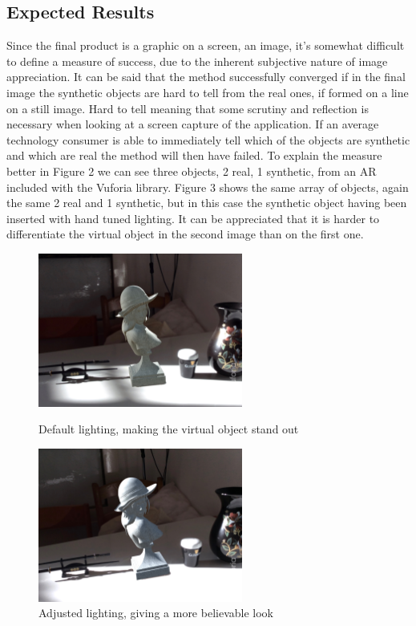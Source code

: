 \subsection{Expected Results}
Since the final product is a graphic on a screen, an image, it's somewhat difficult to define a measure of success, due to the inherent subjective nature of image appreciation. It can be said that the method successfully converged if in the final image the synthetic objects are hard to tell from the real ones, if formed on a line on a still image. Hard to tell meaning that some scrutiny and reflection is necessary when looking at a screen capture of the application. If an average technology consumer is able to immediately tell which of the objects are synthetic and which are real the method will then have failed. To explain the measure better in Figure 2 we can see three objects, 2 real, 1 synthetic, from an AR included with the Vuforia library. Figure 3 shows the same array of objects, again the same 2 real and 1 synthetic, but in this case the synthetic object having been inserted with hand tuned lighting. It can be appreciated that it is harder to differentiate the virtual object in the second image than on the first one.
\begin{figure}[H]
\centering
\includegraphics[width=0.6\textwidth]{Figures/fake.jpg}
\caption{Default lighting, making the virtual object stand out}
\includegraphics[width=0.6\textwidth]{Figures/realish.jpg}
\caption{Adjusted lighting, giving a more believable look}
\end{figure}
